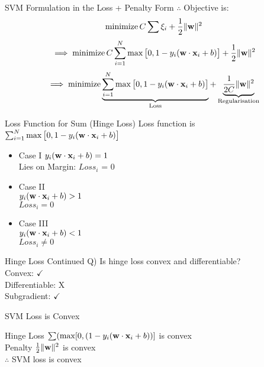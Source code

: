 \documentclass{beamer}
\begin{document}
	\begin{frame}{SVM Formulation in the Loss + Penalty Form}
		$\therefore$ Objective is:
		$$\operatorname{minimize} C \sum \xi_{i} + \frac{1}{2}\|\mathbf{w}\|^{2}$$
		$$\implies \operatorname{minimize} C \sum_{i=1}^{N} \max\big[0, 1 - y_{i}(\mathbf{w} \cdot \mathbf{x}_{i} + b)\big] + \frac{1}{2}\|\mathbf{w}\|^{2}$$
		$$\implies \operatorname{minimize} \underbrace{\sum_{i=1}^{N}\max \big[0, 1-y_{i}(\mathbf{w} \cdot \mathbf{x}_{i} + b)\big]}_\text{Loss} + \underbrace{ \frac{1}{2C}\|\mathbf{w}\|^{2}}_\text{Regularisation}$$
	\end{frame}
	

{
	
}

	\begin{frame}{Loss Function for Sum (Hinge Loss)}
		Loss function is $\sum_{i=1}^{N}\max\big[0, 1 - y_{i}(\mathbf{w} \cdot \mathbf{x}_{i} + b)\big]$ \\
		\begin{itemize}[<+->]
			\item Case I 
			\hspace{0.5cm} $y_{i}(\mathbf{w} \cdot \mathbf{x}_{i} + b) = 1$ \\
			
			Lies on Margin: $Loss_{i}$ = 0 \\
		
			\item Case II \\
			\hspace{0.5cm} $y_{i}(\mathbf{w} \cdot \mathbf{x}_{i} + b) > 1$ \\
			$Loss_{i} = 0$ \\ 
			
			\item 	Case III \\
			\hspace{0.5cm} $y_{i}(\mathbf{w} \cdot \mathbf{x}_{i} + b) < 1$ \\
			$Loss_{i} \neq 0$
		\end{itemize}
		
		
	
	\end{frame}
	\begin{frame}{Hinge Loss Continued}
		Q) Is hinge loss convex and differentiable? \\
		\hspace{0.5cm}Convex: $\checkmark$ \\
		\hspace{0.5cm}Differentiable: X\\
		\hspace{0.5cm}Subgradient: $\checkmark$
	\end{frame}
	\begin{frame}{SVM Loss is Convex}
		
		Hinge Loss $\sum(\max[0, (1-y_{i}(\mathbf{w} \cdot \mathbf{x}_{i}+b))]$ is convex \\
		\vspace{1cm}
		Penalty $\frac{1}{2}\|\mathbf{w}\|^{2}$ is convex \\
		\vspace{1cm}
		$\therefore$ SVM loss is convex
	\end{frame}
	
\end{document}
